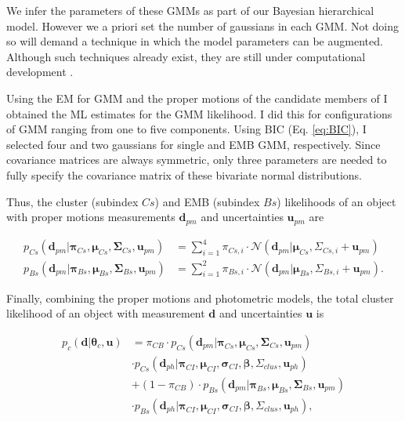We infer the parameters of these GMMs as part of our Bayesian hierarchical model. However we a priori set the number of gaussians in each GMM. Not doing so will demand a technique in which the model parameters can be augmented. Although such techniques already exist, they are still under computational development \cite[see][for a review of reversible jump MCMC]{Fan2011}.

Using the EM for GMM and the proper motions of the candidate members of \citet{Bouy2015} I obtained the ML estimates for the GMM likelihood. I did this for configurations of GMM ranging from one to five components. Using  BIC (Eq. \ref{eq:BIC}), I selected four and two gaussians for single and EMB GMM, respectively. Since covariance matrices are always symmetric, only three parameters are needed to fully specify the covariance matrix of these bivariate normal distributions.

Thus, the cluster (subindex $Cs$) and EMB (subindex $Bs$) likelihoods of an object with proper motions measurements $\mathbf{d}_{pm}$ and uncertainties $\mathbf{u}_{pm}$ are

\begin{align}
p_{Cs}(\mathbf{d}_{pm}| \boldsymbol{\pi}_{Cs}, \boldsymbol{\mu}_{Cs},\boldsymbol{\Sigma}_{Cs},\mathbf{u}_{pm})
&= \sum_{i=1}^4\pi_{Cs,i}\cdot \mathcal{N}(\mathbf{d}_{pm} | \boldsymbol{\mu}_{Cs},\Sigma_{Cs,i}+\mathbf{u}_{pm}) \nonumber\\
p_{Bs}(\mathbf{d}_{pm}| \boldsymbol{\pi}_{Bs}, \boldsymbol{\mu}_{Bs},\boldsymbol{\Sigma}_{Bs},\mathbf{u}_{pm})
&= \sum_{i=1}^2\pi_{Bs,i}\cdot \mathcal{N}(\mathbf{d}_{pm} | \boldsymbol{\mu}_{Bs},\Sigma_{Bs,i}+\mathbf{u}_{pm}).
\label{eq:lik-pm}
\end{align}

Finally, combining the proper motions and photometric models, the total cluster likelihood of an object with measurement $\mathbf{d}$ and uncertainties $\mathbf{u}$ is

\begin{align}
p_c(\mathbf{d}|\boldsymbol{\theta}_c,\mathbf{u})&=\pi_{CB}\cdot p_{Cs}(\mathbf{d}_{pm}| \boldsymbol{\pi}_{Cs}, \boldsymbol{\mu}_{Cs},\boldsymbol{\Sigma}_{Cs},\mathbf{u}_{pm}) \nonumber \\ &\cdot  p_{Cs}(\mathbf{d}_{ph}|\boldsymbol{\pi}_{CI},\boldsymbol{\mu}_{CI},\boldsymbol{\sigma}_{CI},\boldsymbol{\beta},\Sigma_{clus},\mathbf{u}_{ph})\nonumber\\
&+(1-\pi_{CB})\cdot p_{Bs}(\mathbf{d}_{pm}| \boldsymbol{\pi}_{Bs}, \boldsymbol{\mu}_{Bs},\boldsymbol{\Sigma}_{Bs},\mathbf{u}_{pm}) \nonumber \\
&\cdot  p_{Bs}(\mathbf{d}_{ph}|\boldsymbol{\pi}_{CI},\boldsymbol{\mu}_{CI},\boldsymbol{\sigma}_{CI}, \boldsymbol{\beta},\Sigma_{clus}, \mathbf{u}_{ph}),
\end{align}

